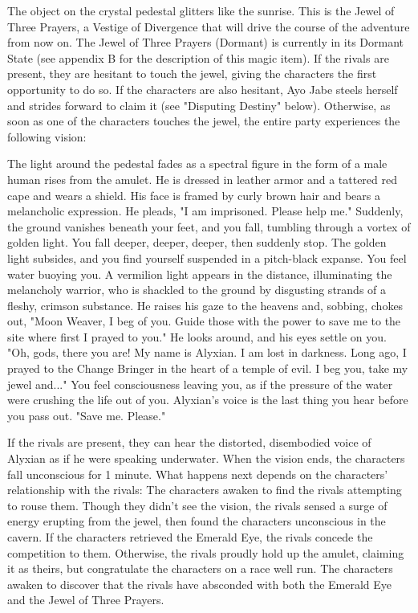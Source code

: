 \documentclass[10pt,a4,twoside,twocolumn,openany,nodeprecatedcode]{dndbook}
\begin{document}
The object on the crystal pedestal glitters like the sunrise. This is the Jewel of Three Prayers, a Vestige of Divergence that will drive the course of the adventure from now on. The Jewel of Three Prayers (Dormant) is currently in its Dormant State (see appendix B for the description of this magic item).
If the rivals are present, they are hesitant to touch the jewel, giving the characters the first opportunity to do so. If the characters are also hesitant, Ayo Jabe steels herself and strides forward to claim it (see "Disputing Destiny" below). Otherwise, as soon as one of the characters touches the jewel, the entire party experiences the following vision:
\begin{DndReadAloud}{}
The light around the pedestal fades as a spectral figure in the form of a male human rises from the amulet. He is dressed in leather armor and a tattered red cape and wears a shield. His face is framed by curly brown hair and bears a melancholic expression. He pleads, "I am imprisoned. Please help me."
Suddenly, the ground vanishes beneath your feet, and you fall, tumbling through a vortex of golden light. You fall deeper, deeper, deeper, then suddenly stop. The golden light subsides, and you find yourself suspended in a pitch-black expanse. You feel water buoying you. A vermilion light appears in the distance, illuminating the melancholy warrior, who is shackled to the ground by disgusting strands of a fleshy, crimson substance.
He raises his gaze to the heavens and, sobbing, chokes out, "Moon Weaver, I beg of you. Guide those with the power to save me to the site where first I prayed to you." He looks around, and his eyes settle on you. "Oh, gods, there you are! My name is Alyxian. I am lost in darkness. Long ago, I prayed to the Change Bringer in the heart of a temple of evil. I beg you, take my jewel and..."
You feel consciousness leaving you, as if the pressure of the water were crushing the life out of you. Alyxian's voice is the last thing you hear before you pass out. "Save me. Please."
\end{DndReadAloud}

If the rivals are present, they can hear the distorted, disembodied voice of Alyxian as if he were speaking underwater. When the vision ends, the characters fall unconscious for 1 minute.
What happens next depends on the characters' relationship with the rivals:
{{The characters awaken to find the rivals attempting to rouse them. Though they didn't see the vision, the rivals sensed a surge of energy erupting from the jewel, then found the characters unconscious in the cavern. If the characters retrieved the Emerald Eye, the rivals concede the competition to them. Otherwise, the rivals proudly hold up the amulet, claiming it as theirs, but congratulate the characters on a race well run.}}
{{The characters awaken to discover that the rivals have absconded with both the Emerald Eye and the Jewel of Three Prayers.}}
\end{document}

